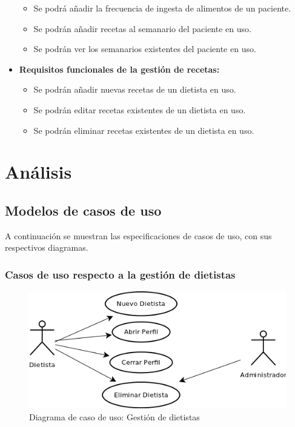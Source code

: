 \begin{itemize}
\begin{itemize}
\item Se podrá añadir la frecuencia de ingesta de alimentos de un paciente.
\item Se podrán añadir recetas al semanario del paciente en uso.
\item Se podrán ver los semanarios existentes del paciente en uso.
\end{itemize}
\item \textbf{Requisitos funcionales de la gestión de recetas:}
\begin{itemize}
\item Se podrán añadir nuevas recetas de un dietista en uso.
\item Se podrán editar recetas existentes de un dietista en uso.
\item Se podrán eliminar recetas existentes de un dietista en uso.
\end{itemize}
\end{itemize}

\section{Análisis}
\subsection{Modelos de casos de uso}
A continuación se muestran las especificaciones de casos de uso, con sus respectivos diagramas.
\subsubsection{Casos de uso respecto a la gestión de dietistas}
\begin{figure}[H]
  \label{cu_dietista}
  \begin{center}
    \includegraphics[scale=0.7]{../img/CU_Dietista.png}
  \end{center}
  \caption{Diagrama de caso de uso: Gestión de dietistas}
\end{figure}

